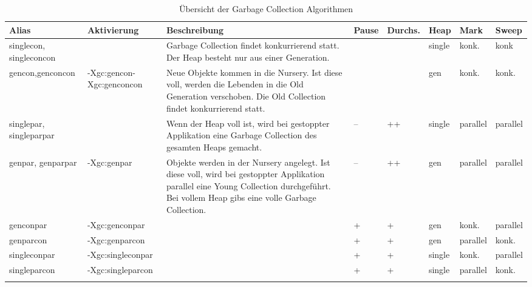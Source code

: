 \begin{landscape}
  \begin{longtable}{|p{2.1cm}|p{3cm}|p{5.5cm}|p{1cm}| p{1.3cm}|p{1cm}|p{1cm}|p{1.1cm}|}
    \hline
  \textbf{Alias} & \textbf{Aktivierung}& \textbf{Beschreibung} & \textbf{Pause} &\textbf{Durchs.} & \textbf{Heap} & \textbf{Mark} & \textbf{Sweep} \\\hline
  singlecon, singleconcon && Garbage Collection findet konkurrierend statt. Der Heap besteht nur aus einer Generation.&\center{++}&\center{--}& single & konk. & konk\\\hline

  gencon,\newline genconcon& -Xgc:gencon\newline-Xgc:genconcon &Neue Objekte kommen in die Nursery. Ist diese voll, werden die Lebenden in die Old Generation verschoben. Die Old Collection findet konkurrierend statt.&\center{++}& \center{--} & gen & konk. & konk.\\\hline	
 
  singlepar, \newline singleparpar& & Wenn der Heap voll ist, wird bei gestoppter Applikation eine Garbage Collection des gesamten Heaps gemacht. & -- & ++ & single & parallel & parallel \\\hline
  genpar, \newline genparpar& -Xgc:genpar & Objekte werden in der Nursery angelegt. Ist diese voll, wird bei gestoppter Applikation parallel eine Young Collection durchgeführt. Bei vollem Heap gibs eine volle Garbage Collection. & -- & ++ & gen& parallel & parallel \\\hline
  genconpar &-Xgc:genconpar&&+&+&gen& konk. & parallel \\\hline
  genparcon &-Xgc:genparcon&&+&+&gen& parallel & konk. \\\hline
  singleconpar &-Xgc:singleconpar&&+&+&single&konk. & parallel \\\hline
  singleparcon& -Xgc:singleparcon&&+&+&single&parallel & konk. \\\hline
\caption{Übersicht der Garbage Collection Algorithmen}
  \end{longtable}
\end{landscape}

